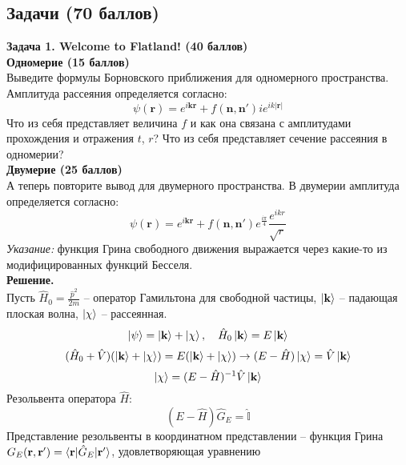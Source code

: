 \documentclass[12pt]{article}
\theoremstyle{definition}
\begin{document}
\subsection*{Задачи (70 баллов)}
\textbf{Задача 1. Welcome to Flatland! (40 баллов)}\\
\textbf{Одномерие (15 баллов)}\\
Выведите формулы Борновского приближения для одномерного пространства. Амплитуда рассеяния определяется согласно:
\begin{equation}
    \psi(\textbf{r}) = e^{i\textbf{k}\textbf{r}} + f(\textbf{n}, \textbf{n}')ie^{ik|\textbf{r}|}
\end{equation}
Что из себя представляет величина $f$ и как она связана с амплитудами прохождения и отражения $t$, $r$? Что из себя представляет сечение рассеяния в одномерии?\\
\textbf{Двумерие (25 баллов)}\\
А теперь повторите вывод для двумерного пространства. В двумерии амплитуда определяется согласно:
\begin{equation}
    \psi(\textbf{r})=e^{i\textbf{k}\textbf{r}}+f(\textbf{n},\textbf{n}')e^{\frac{i\pi}{4}}\frac{e^{ikr}}{\sqrt{r}}
\end{equation}
\textit{Указание:} функция Грина свободного движения выражается через какие-то из модифицированных функций Бесселя.\\
\textbf{Решение.}\\
Пусть $\hat{H}_0=\frac{\hat{p}^2}{2m}$ -- оператор Гамильтона для свободной частицы, $\ket{\textbf{k}}$ -- падающая плоская волна, $\ket{\chi}$ -- рассеянная.
\begin{equation}
    \ket{\psi}=\ket{\textbf{k}}+\ket{\chi},\quad \hat{H}_0\ket{\textbf{k}}=E\ket{\textbf{k}}
\end{equation}
\begin{equation}
    (\hat{H}_0+\hat{V})(\ket{\textbf{k}}+\ket{\chi})=E(\ket{\textbf{k}}+\ket{\chi})\rightarrow(E-\hat{H})\ket{\chi}=\hat{V}\ket{\textbf{k}}
\end{equation}
\begin{equation}
    \ket{\chi}=(E-\hat{H})^{-1}\hat{V}\ket{\textbf{k}}
\end{equation}
Резольвента оператора $\hat{H}$:
\begin{equation}
    (E-\hat{H})\hat{G}_E=\hat{\mathbb{I}}
\end{equation}
Представление резольвенты в координатном представлении -- функция Грина $G_E(\textbf{r},\textbf{r}') = \braket{\textbf{r}|\hat{G}_E|\textbf{r}'}$, удовлетворяющая уравнению
\end{document}
